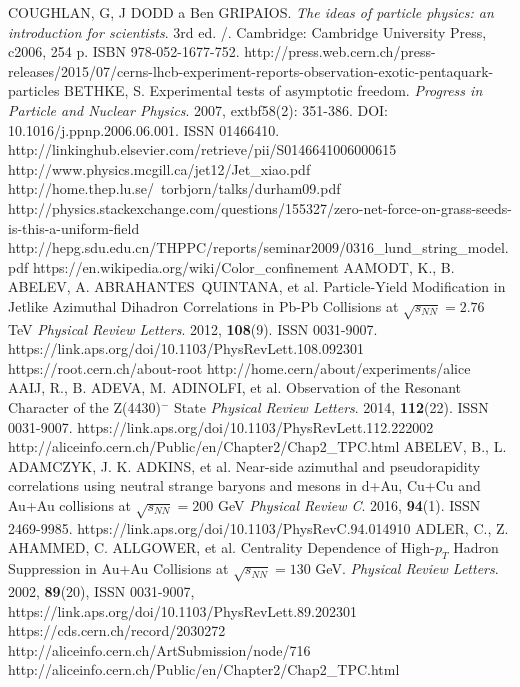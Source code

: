 \documentclass[thesismargins, thesislinespacing]{rnthesis}
\begin{document}
\renewcommand{\bibname}{Zoznam pou�itej literat�ry}
\begin{thebibliography}{}
COUGHLAN, G, J DODD a Ben GRIPAIOS. \textit{The ideas of particle physics: an introduction for scientists}. 3rd ed. /. Cambridge: Cambridge University Press, c2006, 254 p. ISBN 978-052-1677-752.
http://press.web.cern.ch/press-releases/2015/07/cerns-lhcb-experiment-reports-observation-exotic-pentaquark-particles
BETHKE, S. Experimental tests of asymptotic freedom. \textit{Progress in Particle and Nuclear Physics}. 2007, extbf{58}(2): 351-386. DOI: 10.1016/j.ppnp.2006.06.001. ISSN 01466410.  http://linkinghub.elsevier.com/retrieve/pii/S0146641006000615
http://www.physics.mcgill.ca/jet12/Jet\_xiao.pdf
http://home.thep.lu.se/~torbjorn/talks/durham09.pdf	
http://physics.stackexchange.com/questions/155327/zero-net-force-on-grass-seeds-is-this-a-uniform-field
http://hepg.sdu.edu.cn/THPPC/reports/seminar2009/0316\_lund\_string\_model.pdf
https://en.wikipedia.org/wiki/Color\_confinement
AAMODT, K., B. ABELEV, A. ABRAHANTES QUINTANA, et al. Particle-Yield Modification in Jetlike Azimuthal Dihadron Correlations in Pb-Pb Collisions at $\sqrt{s_{NN}} = 2.76$ TeV \textit{Physical Review Letters}. 2012, \textbf{108}(9). ISSN 0031-9007. https://link.aps.org/doi/10.1103/PhysRevLett.108.092301
https://root.cern.ch/about-root
http://home.cern/about/experiments/alice
AAIJ, R., B. ADEVA, M. ADINOLFI, et al. Observation of the Resonant Character of the Z(4430)$^{-}$ State \textit{Physical Review Letters}. 2014, \textbf{112}(22). ISSN 0031-9007. https://link.aps.org/doi/10.1103/PhysRevLett.112.222002
http://aliceinfo.cern.ch/Public/en/Chapter2/Chap2\_TPC.html
ABELEV, B., L. ADAMCZYK, J. K. ADKINS, et al. Near-side azimuthal and pseudorapidity correlations using neutral strange baryons and mesons in d+Au, Cu+Cu and Au+Au collisions at $\sqrt{s_{NN}}=200$ GeV \textit{Physical Review C}. 2016, \textbf{94}(1). ISSN 2469-9985. https://link.aps.org/doi/10.1103/PhysRevC.94.014910
ADLER, C., Z. AHAMMED, C. ALLGOWER, et al. Centrality Dependence of High-$p_T$ Hadron Suppression in Au+Au Collisions at $\sqrt{s_{NN}} = 130$ GeV. \textit{Physical Review Letters}. 2002, \textbf{89}(20), ISSN 0031-9007, https://link.aps.org/doi/10.1103/PhysRevLett.89.202301
https://cds.cern.ch/record/2030272
http://aliceinfo.cern.ch/ArtSubmission/node/716
http://aliceinfo.cern.ch/Public/en/Chapter2/Chap2\_TPC.html


\end{thebibliography}
%
\end{document}
